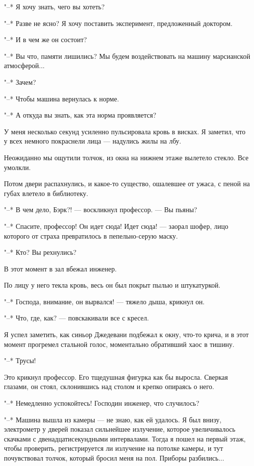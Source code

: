"--* Я хочу знать, чего вы хотеть?

"--* Разве не ясно? Я хочу поставить эксперимент, предложенный доктором.

"--* И в чем же он состоит?

"--*  Вы  что,  памяти  лишились?  Мы  будем  воздействовать   на   машину
марсианской атмосферой...

"--* Зачем?

"--* Чтобы машина вернулась к норме.

"--* А откуда вы знать, как эта норма проявляется?

У меня  несколько  секунд  усиленно  пульсировала  кровь  в  висках.  Я
заметил, что у всех немного покраснели лица --- надулись жилы на лбу.

Неожиданно мы ощутили толчок, из окна на нижнем этаже вылетело  стекло.
Все умолкли.

Потом двери распахнулись, и какое-то существо, ошалевшее  от  ужаса,  с
пеной на губах влетело в библиотеку.

"--* В чем дело, Бэрк?! --- воскликнул профессор. --- Вы пьяны?

"--* Спасите, профессор! Он идет сюда! Идет сюда!  ---  заорал  шофер,  лицо
которого от страха превратилось в пепельно-серую маску.

"--* Кто? Вы рехнулись?

В этот момент в зал вбежал инженер.

По лицу у него текла кровь, весь он был покрыт пылью и штукатуркой.

"--* Господа, внимание, он вырвался! --- тяжело дыша, крикнул он.

"--* Что, где, как? --- повскакивали все с кресел.

Я успел заметить, как синьор Джедевани подбежал к окну, что-то крича, и
в этот момент прогремел стальной  голос,  моментально  обративший  хаос  в
тишину.

"--* Трусы!

Это крикнул профессор. Его тщедушная фигурка как  бы  выросла.  Сверкая
глазами, он стоял, склонившись над столом и крепко опираясь о него.

"--* Немедленно успокойтесь! Господин инженер, что случилось?

"--* Машина вышла из камеры --- не  знаю,  как  ей  удалось.  Я  был  внизу,
электрометр у дверей показал сильнейшее излучение,  которое  увеличивалось
скачками с двенадцатисекундными интервалами. Тогда я пошел на первый этаж,
чтобы проверить, регистрируется ли излучение  на  потолке  камеры,  и  тут
почувствовал толчок, который бросил меня на пол. Приборы разбились...


